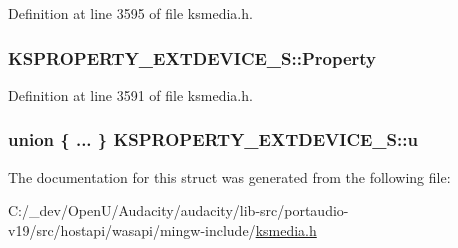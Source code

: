 Definition at line 3595 of file ksmedia.\+h.

\subsubsection[{\texorpdfstring{Property}{Property}}]{ K\+S\+P\+R\+O\+P\+E\+R\+T\+Y\+\_\+\+E\+X\+T\+D\+E\+V\+I\+C\+E\+\_\+\+S\+::\+Property}\hypertarget{struct_k_s_p_r_o_p_e_r_t_y___e_x_t_d_e_v_i_c_e___s_a7cff40f3355d9886502e0a62099a62b2}{}\label{struct_k_s_p_r_o_p_e_r_t_y___e_x_t_d_e_v_i_c_e___s_a7cff40f3355d9886502e0a62099a62b2}


Definition at line 3591 of file ksmedia.\+h.

\subsubsection[{\texorpdfstring{u}{u}}]{\setlength{\rightskip}{0pt plus 5cm}union \{ ... \}   K\+S\+P\+R\+O\+P\+E\+R\+T\+Y\+\_\+\+E\+X\+T\+D\+E\+V\+I\+C\+E\+\_\+\+S\+::u}\hypertarget{struct_k_s_p_r_o_p_e_r_t_y___e_x_t_d_e_v_i_c_e___s_a3d4f3135b014533b91896f6d55c540cd}{}\label{struct_k_s_p_r_o_p_e_r_t_y___e_x_t_d_e_v_i_c_e___s_a3d4f3135b014533b91896f6d55c540cd}


The documentation for this struct was generated from the following file\+:\begin{DoxyCompactItemize}
\item 
C\+:/\+\_\+dev/\+Open\+U/\+Audacity/audacity/lib-\/src/portaudio-\/v19/src/hostapi/wasapi/mingw-\/include/\hyperlink{ksmedia_8h}{ksmedia.\+h}\end{DoxyCompactItemize}
